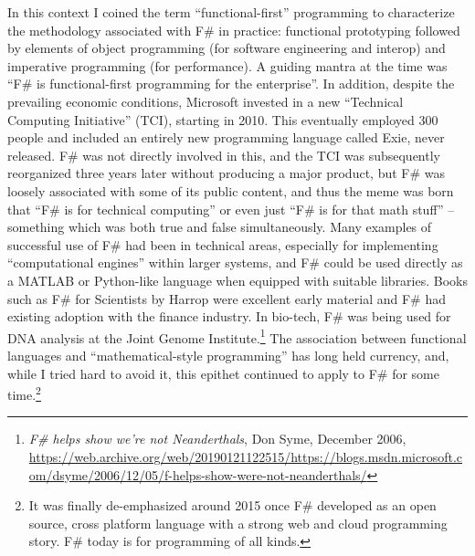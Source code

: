 \documentclass[acmsmall]{acmart}\settopmatter{}
\begin{document}
In this context I coined the term “functional-first” programming to characterize the methodology associated with F\# in practice: functional prototyping
followed by elements of object programming (for software engineering and interop) and imperative programming (for performance). A guiding mantra
at the time was “F\# is functional-first programming for the enterprise”.  In addition, despite the prevailing economic conditions, Microsoft invested in a
new “Technical Computing Initiative” (TCI), starting in 2010. This eventually employed 300 people and included an entirely new programming language
called Exie, never released.  F\# was not directly involved in this, and the TCI was subsequently reorganized three years later without producing a major
product, but F\# was loosely associated with some of its public content, and thus the meme was born that “F\# is for technical computing” or even
just “F\# is for that math stuff” – something which was both true and false simultaneously. Many examples of successful use of F\# had been in
technical areas, especially for implementing “computational engines” within larger systems, and F\# could be used directly as a MATLAB or Python-like
language when equipped with suitable libraries.  Books such as F\# for Scientists by Harrop were excellent early material and F\# had existing adoption
with the finance industry. In bio-tech, F\# was being used for DNA analysis at the Joint Genome
Institute.\footnote{\textit{F\# helps show we’re not Neanderthals}, Don Syme, December 2006, \url{https://web.archive.org/web/20190121122515/https://blogs.msdn.microsoft.com/dsyme/2006/12/05/f-helps-show-were-not-neanderthals/}}  The association between functional languages and
“mathematical-style programming” has long held currency, and, while I tried hard to avoid it, this epithet continued to
apply to F\# for some time.\footnote{It was finally de-emphasized around 2015 once F\# developed as an open source, cross
platform language with a strong web and cloud programming story. F\# today is for programming of all kinds.}
\end{document}
